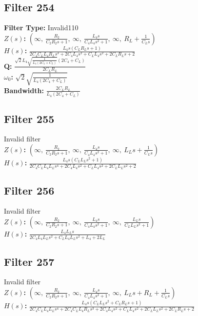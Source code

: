 \documentclass{article}
\begin{document}
\subsection*{Filter 254}
\textbf{Filter Type:} Invalid110 \\ 
\textbf{$Z(s)$:} $\left( \infty, \  \frac{R_{2}}{C_{2} R_{2} s + 1}, \  \infty, \  \frac{L_{4} s}{C_{4} L_{4} s^{2} + 1}, \  \infty, \  R_{L} + \frac{1}{C_{L} s}\right)$ \\ 
\textbf{$H(s)$:} $\frac{L_{4} s \left(C_{L} R_{L} s + 1\right)}{2 C_{4} C_{L} L_{4} R_{L} s^{3} + 2 C_{4} L_{4} s^{2} + C_{L} L_{4} s^{2} + 2 C_{L} R_{L} s + 2}$ \\ 
\textbf{Q:} $\frac{\sqrt{2} L_{4} \sqrt{\frac{1}{L_{4} \left(2 C_{4} + C_{L}\right)}} \left(2 C_{4} + C_{L}\right)}{2 C_{L} R_{L}}$ \\ 
\textbf{$\omega_0$:} $\sqrt{2} \sqrt{\frac{1}{L_{4} \left(2 C_{4} + C_{L}\right)}}$ \\ 
\textbf{Bandwidth:} $\frac{2 C_{L} R_{L}}{L_{4} \left(2 C_{4} + C_{L}\right)}$ \\ 
\subsection*{Filter 255}
Invalid filter \\ 
\textbf{$Z(s)$:} $\left( \infty, \  \frac{R_{2}}{C_{2} R_{2} s + 1}, \  \infty, \  \frac{L_{4} s}{C_{4} L_{4} s^{2} + 1}, \  \infty, \  L_{L} s + \frac{1}{C_{L} s}\right)$ \\ 
\textbf{$H(s)$:} $\frac{L_{4} s \left(C_{L} L_{L} s^{2} + 1\right)}{2 C_{4} C_{L} L_{4} L_{L} s^{4} + 2 C_{4} L_{4} s^{2} + C_{L} L_{4} s^{2} + 2 C_{L} L_{L} s^{2} + 2}$ \\ 
\subsection*{Filter 256}
Invalid filter \\ 
\textbf{$Z(s)$:} $\left( \infty, \  \frac{R_{2}}{C_{2} R_{2} s + 1}, \  \infty, \  \frac{L_{4} s}{C_{4} L_{4} s^{2} + 1}, \  \infty, \  \frac{L_{L} s}{C_{L} L_{L} s^{2} + 1}\right)$ \\ 
\textbf{$H(s)$:} $\frac{L_{4} L_{L} s}{2 C_{4} L_{4} L_{L} s^{2} + C_{L} L_{4} L_{L} s^{2} + L_{4} + 2 L_{L}}$ \\ 
\subsection*{Filter 257}
Invalid filter \\ 
\textbf{$Z(s)$:} $\left( \infty, \  \frac{R_{2}}{C_{2} R_{2} s + 1}, \  \infty, \  \frac{L_{4} s}{C_{4} L_{4} s^{2} + 1}, \  \infty, \  L_{L} s + R_{L} + \frac{1}{C_{L} s}\right)$ \\ 
\textbf{$H(s)$:} $\frac{L_{4} s \left(C_{L} L_{L} s^{2} + C_{L} R_{L} s + 1\right)}{2 C_{4} C_{L} L_{4} L_{L} s^{4} + 2 C_{4} C_{L} L_{4} R_{L} s^{3} + 2 C_{4} L_{4} s^{2} + C_{L} L_{4} s^{2} + 2 C_{L} L_{L} s^{2} + 2 C_{L} R_{L} s + 2}$ \\ 
\end{document}
